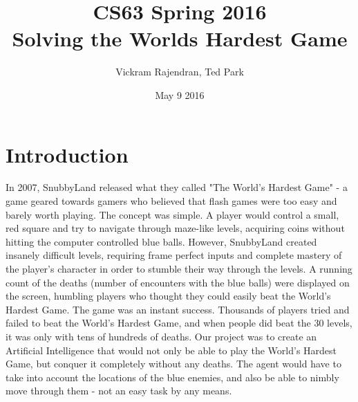 \documentclass[11pt]{article}
\title{CS63 Spring 2016\\Solving the Worlds Hardest Game}
\author{Vickram Rajendran, Ted Park}
\date{May 9 2016}
\begin{document}
\maketitle

\section{Introduction}


In 2007, SnubbyLand released what they called "The World's Hardest Game" - a game geared towards gamers who believed that flash games were too easy and barely worth playing. The concept was simple. A player would control a small, red square and try to navigate through maze-like levels, acquiring coins without hitting the computer controlled blue balls. However, SnubbyLand created insanely difficult levels, requiring frame perfect inputs and complete mastery of the player's character in order to stumble their way through the levels. A running count of the deaths (number of encounters with the blue balls) were displayed on the screen, humbling players who thought they could easily beat the World's Hardest Game. The game was an instant success. Thousands of players tried and failed to beat the World's Hardest Game, and when people did beat the 30 levels, it was only with tens of hundreds of deaths. Our project was to create an Artificial Intelligence that would not only be able to play the World's Hardest Game, but conquer it completely without any deaths. The agent would have to take into account the locations of the blue enemies, and also be able to nimbly move through them - not an easy task by any means. 
\end{document}
